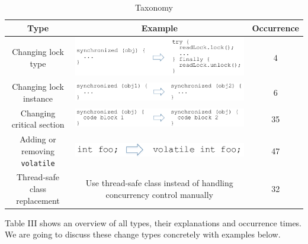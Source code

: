 \documentclass[conference]{IEEEtran}
\begin{document}

\begin{table}
	\centering
	\caption{Taxonomy}
	\begin{tabular}{|c|c|c|}\hline
		Type&Example&Occurrence\\\hline
		Changing lock type&\includegraphics[scale=0.35]{pattern1}&4\\\hline
		Changing lock instance&\includegraphics[scale=0.35]{pattern2}&6\\\hline
		Changing critical section&\includegraphics[scale=0.35]{pattern3}&35\\\hline
		Adding or removing \texttt{volatile}&\includegraphics[scale=0.35]{pattern4}&47\\\hline
		Thread-safe class replacement&Use thread-safe class instead of handling concurrency control manually&32\\\hline
	\end{tabular}
\end{table}


Table III shows an overview of all types, their explanations and occurrence times. We are going to discuss these change types concretely with examples below.
\end{document}
